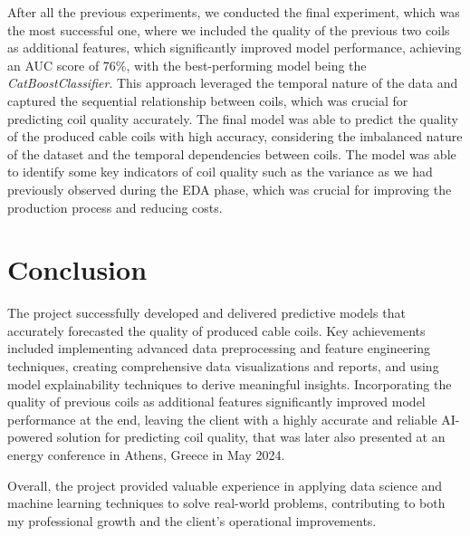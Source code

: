 After all the previous experiments, we conducted the final experiment, which
was the most successful one, where we included the quality of the previous two
coils as additional features, which significantly improved model performance,
achieving an AUC score of 76\%, with the best-performing model being the
\emph{CatBoostClassifier}. This approach leveraged the temporal nature of the
data and captured the sequential relationship between coils, which was crucial
for predicting coil quality accurately. The final model was able to predict the
quality of the produced cable coils with high accuracy, considering the
imbalanced nature of the dataset and the temporal dependencies between coils.
The model was able to identify some key indicators of coil quality such as the
variance as we had previously observed during the EDA phase, which was crucial
for improving the production process and reducing costs.

\section{Conclusion}

The project successfully developed and delivered predictive models that
accurately forecasted the quality of produced cable coils. Key achievements
included implementing advanced data preprocessing and feature engineering
techniques, creating comprehensive data visualizations and reports, and using
model explainability techniques to derive meaningful insights. Incorporating
the quality of previous coils as additional features significantly improved
model performance at the end, leaving the client with a highly accurate and
reliable AI-powered solution for predicting coil quality, that was later also
presented at an energy conference in Athens, Greece in May 2024.

Overall, the project provided valuable experience in applying data science and
machine learning techniques to solve real-world problems, contributing to both
my professional growth and the client's operational improvements.

